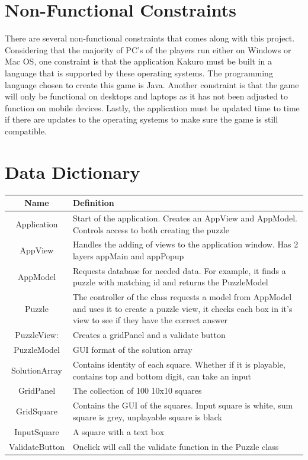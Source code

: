 \documentclass[12pt]{article}
\begin{document}
\clearpage

\section{Non-Functional Constraints}
There are several non-functional constraints that comes along with this project. Considering that the majority of PC’s of the players run either on Windows or Mac OS, one constraint is that the application Kakuro must be built in a language that is supported by these operating systems. The programming language chosen to create this game is Java. Another constraint is that the game will only be functional on desktops and laptops as it has not been adjusted to function on mobile devices. Lastly, the application must be updated time to time if there are updates to the operating systems to make sure the game is still compatible.\\

\clearpage

\section{Data Dictionary}

\begin{table}[htbp]
\begin{tabular}{|c | m{10cm}|}
\hline
\cellcolor{gray}Name & \cellcolor{gray}Definition \\
\hline
Application & Start of the application. Creates an AppView and AppModel. Controls access to both creating the puzzle  \\
\hline
AppView & Handles the adding of views to the application window. Has 2 layers appMain and appPopup \\
\hline
AppModel & Requests database for needed data. For example, it finds a puzzle with matching id and returns the PuzzleModel \\
\hline
Puzzle & The controller of the class requests a model from AppModel and uses it to create a puzzle view, it checks each box in it's view to see if they have the correct answer \\
\hline
PuzzleView: & Creates a gridPanel and a validate button\\
\hline
PuzzleModel & GUI format of the solution array\\
\hline
SolutionArray & Contains identity of each square. Whether if it is playable, contains top and bottom digit, can take an input\\
\hline
GridPanel & The collection of 100 10x10 squares \\
\hline
GridSquare & Contains the GUI of the squares. Input square is white, sum square is grey, unplayable square is black\\
\hline
InputSquare & A square with a text box
 \\
\hline
ValidateButton & Onclick will call the validate function in the Puzzle class \\
\hline
\end{tabular}

\end{table}
\end{document}
